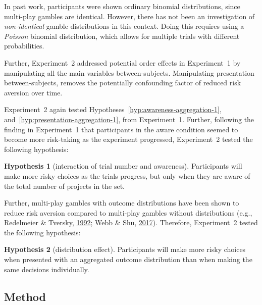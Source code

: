 \documentclass[
  english,
  man, donotrepeattitle,floatsintext]{apa7}
\theoremstyle{definition}
\theoremstyle{definition}
\theoremstyle{definition}
\theoremstyle{definition}
\newtheorem{hypothesis}{Hypothesis}
\theoremstyle{remark}
\begin{document}
In past work, participants were shown ordinary binomial distributions, since
multi-play gambles are identical. However, there has not been an investigation
of \emph{non-identical} gamble distributions in this context. Doing this requires
using a \emph{Poisson} binomial distribution, which allows for multiple trials with
different probabilities.

Further, Experiment~2 addressed potential order effects in Experiment~1 by
manipulating all the main variables between-subjects. Manipulating presentation
between-subjects, removes the potentially confounding factor of reduced risk
aversion over time.

Experiment~2 again tested Hypotheses~\ref{hyp:awareness-aggregation-1},
and~\ref{hyp:presentation-aggregation-1}, from Experiment~1. Further, following
the finding in Experiment~1 that participants in the aware condition seemed to
become more risk-taking as the experiment progressed, Experiment~2 tested the
following hypothesis:

\begin{hypothesis}[interaction of trial number and awareness]
\protect\hypertarget{hyp:awareness-trials-aggregation-2}{}{\label{hyp:awareness-trials-aggregation-2} \iffalse (interaction of trial number and awareness) \fi{} }Participants will make more risky choices as the trials progress, but only when
they are aware of the total number of projects in the set.
\end{hypothesis}

Further, multi-play gambles with outcome distributions have been shown to reduce
risk aversion compared to multi-play gambles without distributions (e.g., Redelmeier \& Tversky, \protect\hyperlink{ref-redelmeier1992}{1992}; Webb \& Shu, \protect\hyperlink{ref-webb2017}{2017}). Therefore, Experiment~2 tested the following
hypothesis:

\begin{hypothesis}[distribution effect]
\protect\hypertarget{hyp:distribution-aggregation-2}{}{\label{hyp:distribution-aggregation-2} \iffalse (distribution effect) \fi{} }Participants will make more risky choices when presented with an aggregated
outcome distribution than when making the same decisions individually.
\end{hypothesis}

\hypertarget{method-1}{%
\subsection{Method}\label{method-1}}
\end{document}
